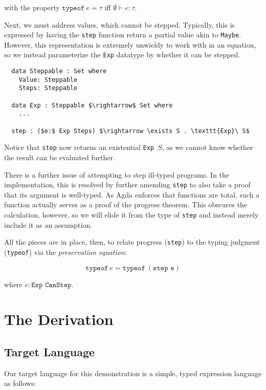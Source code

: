\documentclass[manuscript,screen,sigplan]{acmart}
\begin{document}
with the property $\texttt{typeof}\ e = \tau$ iff $\emptyset \vdash e : \tau$.

Next, we must address values, which cannot be stepped. Typically, this is
expressed by having the \texttt{step} function return a partial value akin to
\texttt{Maybe}. However, this representation is extremely unwieldy to work with
in an equation, so we instead parameterize the \texttt{Exp} datatype by whether
it can be stepped.

\begin{lstlisting}
  data Steppable : Set where
    Value: Steppable
    Steps: Steppable

  data Exp : Steppable $\rightarrow$ Set where
    ...

  step : ($e:$ Exp Steps) $\rightarrow \exists S . \texttt{Exp}\ S$
\end{lstlisting}

Notice that \texttt{step} now returns an existential \texttt{Exp }$S$, as we
cannot know whether the result can be evaluated further.

There is a further issue of attempting to step ill-typed programs. In the
implementation, this is resolved by further amending \texttt{step} to also take
a proof that its argument is well-typed. As Agda enforces that functions are
total, such a function actually serves as a proof of the progress theorem.
This obscures the calculation, however, so we will elide it from the type of
\texttt{step} and instead merely include it as an assumption.

All the pieces are
in place, then, to relate progress (\texttt{step}) to the typing judgment
(\texttt{typeof}) via the \emph{preservation equation}:

\begin{equation}\label{eq:preservation}
  \texttt{typeof}\ e = \texttt{typeof}\ (\texttt{step e})
\end{equation}

where $e : \texttt{Exp CanStep}$.

\section{The Derivation}

\subsection{Target Language}

Our target language for this demonstration is a simple, typed expression
language as follows:
\end{document}
